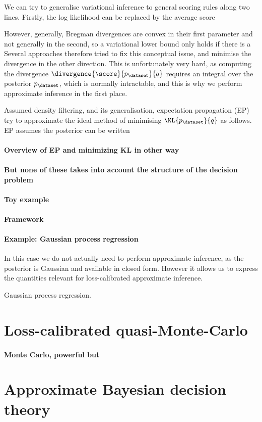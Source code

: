 We can try to generalise variational inference to general scoring rules along two lines. Firstly, the log likelihood can be replaced by the average score 
 

However, generally, Bregman divergences are convex in their first parameter and not generally in the second, so a variational lower bound only holds if there is a 
Several approaches therefore tried to fix this conceptual issue, and minimise the divergence in the other direction. This is unfortunately very hard, as computing the divergence $\divergence{\score}{p_{\dataset}}{q}$ requires an integral over the posterior $p_{\dataset}$, which is normally intractable, and this is why we perform approximate inference in the first place.

Assumed density filtering, and its generalisation, expectation propagation (EP) try to approximate the ideal method of minimising $\KL{p_{\dataset}}{q}$ as follows. EP assumes the posterior can be written 

	


\paragraph{Overview of EP and minimizing KL in other way}

\paragraph{But none of these takes into account the structure of the decision problem}

\paragraph{Toy example}

\paragraph{Framework}

\paragraph{Example: Gaussian process regression}

In this case we do not actually need to perform approximate inference, as the posterior is Gaussian and available in closed form. However it allows us to express the quantities relevant for loss-calibrated approximate inference.

Gaussian process regression.

\section{Loss-calibrated quasi-Monte-Carlo}

\paragraph{Monte Carlo, powerful but}

\section{Approximate Bayesian decision theory}


